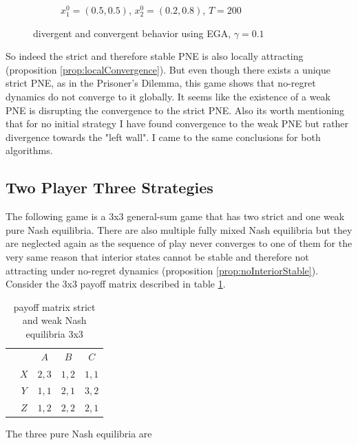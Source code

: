 \begin{figure}[H]
\begin{subfigure}{.5\textwidth}
    \caption{$x_{1}^0 = (0.5,0.5)$, $x_{2}^0 = (0.2,0.8)$, $T = 200$}
    \label{fig:Weak3b}
\end{subfigure}
\caption{divergent and convergent behavior using EGA, $\gamma = 0.1$}
\label{fig:2x2Weak3}
\end{figure}

So indeed the strict and therefore stable PNE is also locally attracting (proposition \ref{prop:localConvergence}). But even though there exists a unique strict PNE, as in the Prisoner's Dilemma, this game shows that no-regret dynamics do not converge to it globally. It seems like the existence of a weak PNE is disrupting the convergence to the strict PNE. Also its worth mentioning that for no initial strategy I have found convergence to the weak PNE but rather divergence towards the "left wall". I came to the same conclusions for both algorithms.


\subsection{Two Player Three Strategies}\label{subsection:TwoPlayerThreeStrategies}

The following game is a 3x3 general-sum game that has two strict and one weak pure Nash equilibria. There are also multiple fully mixed Nash equilibria but they are neglected again as the sequence of play never converges to one of them for the very same reason that interior states cannot be stable and therefore not attracting under no-regret dynamics (proposition \ref{prop:noInteriorStable}). Consider the 3x3 payoff matrix described in table \ref{tab:payoffStrictAndWeak3x3}. 

\begin{table}[H]\centering
\setlength{\extrarowheight}{2pt}
\begin{tabular}{cc|c|c|c|}
  & \multicolumn{1}{c}{} & \multicolumn{1}{c}{$A$}  & \multicolumn{1}{c}{$B$}  & \multicolumn{1}{c}{$C$} \\\cline{3-5}
            & $X$ & $2,3$ & $1,2$ & $1,1$ \\ \cline{3-5}
            & $Y$ & $1,1$ & $2,1$ & $3,2$ \\\cline{3-5}
            & $Z$ & $1,2$ & $2,2$ & $2,1$ \\\cline{3-5}
\end{tabular}\caption{\label{tab:payoffStrictAndWeak3x3}payoff matrix strict and weak Nash equilibria 3x3}
\end{table}

The three pure Nash equilibria are

